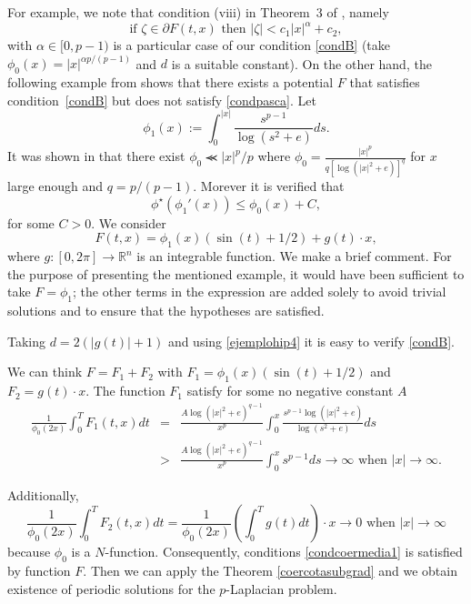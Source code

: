 \documentclass[twoside]{article}
\theoremstyle{definition}
\theoremstyle{plain}
\theoremstyle{remark}
\begin{document}
For example, we note that condition (viii) in Theorem~$3$ of \cite{pacsca2007periodic}, namely
\begin{equation}\label{condpasca}
\text{if } \zeta \in \partial F(t,x) \text{ then } |\zeta| < c_1 |x|^\alpha + c_2,
\end{equation}
with $\alpha \in [0,p-1)$ is a particular case of our condition \ref{condB} (take $\phi_0(x)= |x|^{\alpha p/(p-1)}$ and $d$ is a suitable constant).
On the other hand, the following example from \cite{acinas2022} shows that there exists a potential $F$ that satisfies condition~\ref{condB} but does not satisfy \eqref{condpasca}.
  Let
\[
 \phi_1(x):=\int_0^{|x|}\frac{s^{p-1}}{\log (s^2+e)}ds.
\]
It was shown in \cite{acinas2022} that there exist $\phi_0\llcurly |x|^p/p$ where $\phi_0=\frac{|x|^p}{q[\log(|x|^2+e)]^q}$ for $x$ large enough and $q=p/(p-1)$. Morever it is verified that
\begin{equation}\label{ejemplohip4}
 \phi^\star\left(\phi_1'(x)\right)\leq \phi_0(x)+C,
\end{equation}
for some $C>0$.
We consider \[F(t,x)= \phi_1(x)(\sin(t)+1/2)+ g(t)\cdot x,\]
where $g:[0,2\pi] \to \mathbb{R}^n$ is an integrable function. We make a brief comment. For the purpose of presenting the mentioned example, it would have been sufficient to take $F=\phi_1$; the other terms in the expression are added solely to avoid trivial solutions and to ensure that the hypotheses are satisfied.

Taking $d=2(|g(t)|+1)$ and using \eqref{ejemplohip4} it is easy to verify  \ref{condB}.

We can think $F=F_1+F_2$ with $F_1= \phi_1(x)(\sin(t)+1/2)$ and $F_2=g(t)\cdot x $. The function $F_1$ satisfy  for some no negative constant $A$
\begin{eqnarray*}
 \frac{1}{\phi_0(2x)}\int_0^T F_1(t,x) dt&=&\frac{A \log(|x|^2+e)^{q-1}}{x^p}\int_0^x\frac{s^{p-1}\log(|x|^2+e)}{\log(s^2+e)}ds\\&>&\frac{A\log(|x|^2+e)^{q-1}}{x^p}\int_0^x s^{p-1}ds \to \infty \text{ when } |x|\to \infty.
\end{eqnarray*}

Additionally,
\[\frac{1}{\phi_0(2x)}\int_0^T F_2(t, x)dt=\frac{1}{\phi_0(2x)} \left(\int_0^T g(t) dt \right)\cdot x \to 0 \text { when }|x|\to \infty\] because $\phi_0$ is a $N$-function. Consequently,  conditions \ref{condcoermedia1} is satisfied by function $F$.  Then we can apply the Theorem \ref{coercotasubgrad}  and we obtain existence of periodic solutions for the $p$-Laplacian problem.
\end{document}
